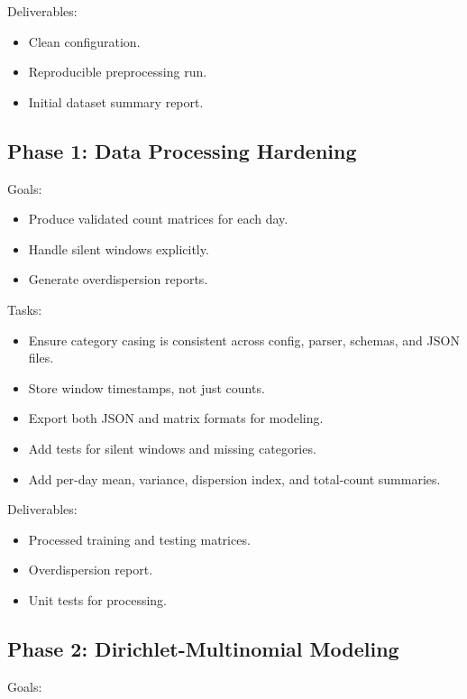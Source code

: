 \documentclass[11pt,a4paper]{article}
\begin{document}
Deliverables:

\begin{itemize}
  \item Clean configuration.
  \item Reproducible preprocessing run.
  \item Initial dataset summary report.
\end{itemize}

\subsection{Phase 1: Data Processing Hardening}

Goals:

\begin{itemize}
  \item Produce validated count matrices for each day.
  \item Handle silent windows explicitly.
  \item Generate overdispersion reports.
\end{itemize}

Tasks:

\begin{itemize}
  \item Ensure category casing is consistent across config, parser, schemas, and JSON files.
  \item Store window timestamps, not just counts.
  \item Export both JSON and matrix formats for modeling.
  \item Add tests for silent windows and missing categories.
  \item Add per-day mean, variance, dispersion index, and total-count summaries.
\end{itemize}

Deliverables:

\begin{itemize}
  \item Processed training and testing matrices.
  \item Overdispersion report.
  \item Unit tests for processing.
\end{itemize}

\subsection{Phase 2: Dirichlet-Multinomial Modeling}

Goals:
\end{document}

